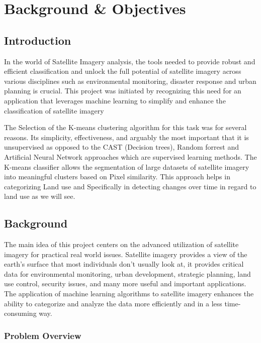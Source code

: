 \chapter{Background \& Objectives}\label{ch:background-&-objectives}


\section{Introduction}\label{sec:introduction}

In the world of Satellite Imagery analysis, the tools needed to provide robust and efficient classification and unlock the
full potential of satellite imagery across various disciplines such as environmental monitoring, disaster response and
urban planning is crucial.
This project was initiated by recognizing this need for an application that leverages machine learning to simplify and enhance the classification of
satellite imagery

The Selection of the K-means clustering algorithm for this task was for several reasons.
Its simplicity, effectiveness, and arguably the most important that it is unsupervised as opposed to the CAST (Decision trees),
Random forrest and Artificial Neural Network approaches which are supervised learning methods.
The K-means classifier allows the segmentation of large datasets of satellite imagery into meaningful clusters based on Pixel similarity.
This approach helps in categorizing Land use and Specifically in detecting changes over time in regard to land use as we will see.

\section{Background}\label{sec:background}

The main idea of this project centers on the advanced utilization of satellite imagery for practical real world issues\cite{urbanEcology2022}.
Satellite imagery provides a view of the earth's surface that most individuals don't usually look at, it provides critical data for environmental monitoring,
urban development, strategic planning, land use control, security issues, and many more useful and important applications.
The application of machine learning algorithms to satellite imagery enhances the ability to categorize and analyze the data more efficiently
and in a less time-consuming way.

\subsection{Problem Overview}\label{subsec:problem-overview}

